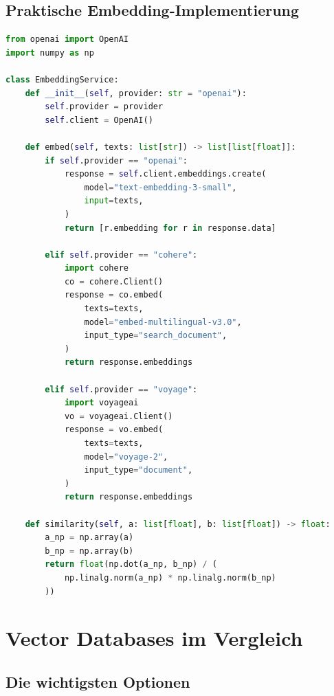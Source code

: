 \subsection{Praktische Embedding-Implementierung}

\begin{lstlisting}[language=Python, caption=Embedding-Service mit Multi-Provider-Unterstützung]
from openai import OpenAI
import numpy as np

class EmbeddingService:
    def __init__(self, provider: str = "openai"):
        self.provider = provider
        self.client = OpenAI()

    def embed(self, texts: list[str]) -> list[list[float]]:
        if self.provider == "openai":
            response = self.client.embeddings.create(
                model="text-embedding-3-small",
                input=texts,
            )
            return [r.embedding for r in response.data]

        elif self.provider == "cohere":
            import cohere
            co = cohere.Client()
            response = co.embed(
                texts=texts,
                model="embed-multilingual-v3.0",
                input_type="search_document",
            )
            return response.embeddings

        elif self.provider == "voyage":
            import voyageai
            vo = voyageai.Client()
            response = vo.embed(
                texts=texts,
                model="voyage-2",
                input_type="document",
            )
            return response.embeddings

    def similarity(self, a: list[float], b: list[float]) -> float:
        a_np = np.array(a)
        b_np = np.array(b)
        return float(np.dot(a_np, b_np) / (
            np.linalg.norm(a_np) * np.linalg.norm(b_np)
        ))
\end{lstlisting}

\section{Vector Databases im Vergleich}

\subsection{Die wichtigsten Optionen}

